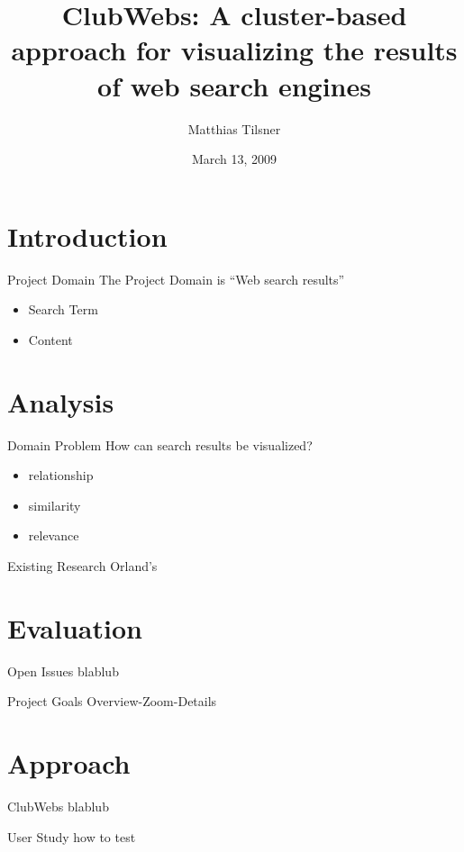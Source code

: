 \documentclass{beamer}
\title{ClubWebs: A cluster-based approach for visualizing the results of web search engines}
\author{Matthias Tilsner}
\date{March 13, 2009}
\begin{document}
\frame{\titlepage}

\frame{\tableofcontents}

\section{Introduction}
\begin{frame}{Project Domain}
	The Project Domain is ``Web search results''
	\begin{itemize}
		\item Search Term
		\item Content
	\end{itemize}
\end{frame}

\section{Analysis}
\begin{frame}{Domain Problem}
	How can search results be visualized?
	\begin{itemize}
		\item relationship
		\item similarity
		\item relevance
	\end{itemize}
\end{frame}

\begin{frame}{Existing Research}
	Orland's 
\end{frame}

\section{Evaluation}
\begin{frame}{Open Issues}
	blablub
\end{frame}

\begin{frame}{Project Goals}
	Overview-Zoom-Details
\end{frame}

\section{Approach}
\begin{frame}{ClubWebs}
	blablub
\end{frame}

\begin{frame}{User Study}
	how to test
\end{frame}
\end{document}
